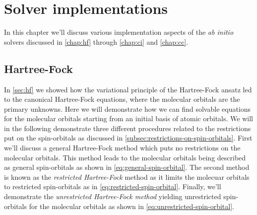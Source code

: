 \chapter{Solver implementations}
    In this chapter we'll discuss various implementation aspects of the \emph{ab
    initio} solvers discussed in \autoref{chap:hf} through \autoref{chap:ci} and
    \autoref{chap:cc}.

    \section{Hartree-Fock}
        In \autoref{sec:hf} we showed how the variational principle of the
        Hartree-Fock ansatz led to the canonical Hartree-Fock equations, where
        the molecular orbitals are the primary unknowns.
        Here we will demonstrate how we can find solvable equations for the
        molecular orbitals starting from an initial basis of atomic orbitals.
        We will in the following demonstrate three different procedures related
        to the restrictions put on the spin-orbitals as discussed in
        \autoref{subsec:restrictions-on-spin-orbitals}.
        First we'll discuss a general Hartree-Fock method which puts no
        restrictions on the molecular orbitals.
        This method leads to the molecular orbitals being described as general
        spin-orbitals as shown in \autoref{eq:general-spin-orbital}.
        The second method is known as the \emph{restricted Hartree-Fock} method
        as it limits the molecuar orbitals to restricted spin-orbitals as
        in \autoref{eq:restricted-spin-orbital}.
        Finally, we'll demonstrate the \emph{unrestricted Hartree-Fock method}
        yielding unrestricted spin-orbitals for the molecular orbitals as
        shown in \autoref{eq:unrestricted-spin-orbital}.

